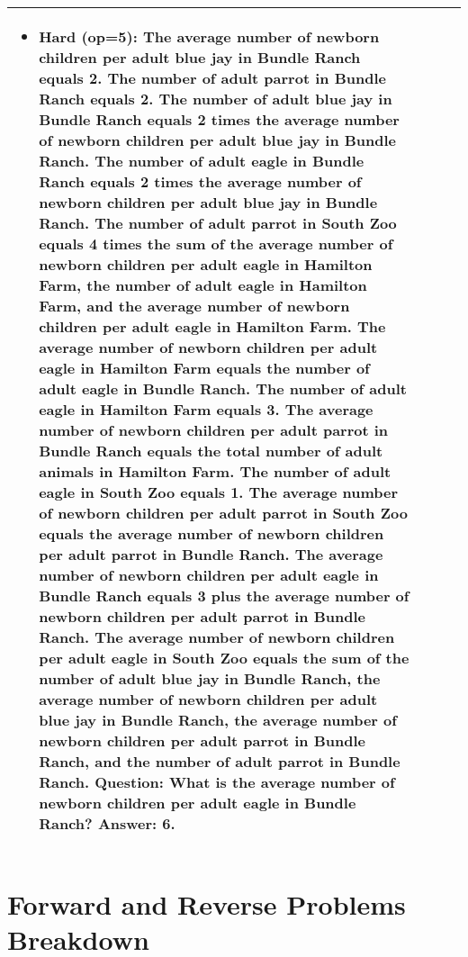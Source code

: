 \begin{table}[h]
\begin{tabular}{llll}
{\begin{itemize}
\item \textbf{Hard (op=5):} The average number of newborn children per adult blue jay in Bundle Ranch equals 2. The number of adult parrot in Bundle Ranch equals 2. The number of adult blue jay in Bundle Ranch equals 2 times the average number of newborn children per adult blue jay in Bundle Ranch. The number of adult eagle in Bundle Ranch equals 2 times the average number of newborn children per adult blue jay in Bundle Ranch. The number of adult parrot in South Zoo equals 4 times the sum of the average number of newborn children per adult eagle in Hamilton Farm, the number of adult eagle in Hamilton Farm, and the average number of newborn children per adult eagle in Hamilton Farm. The average number of newborn children per adult eagle in Hamilton Farm equals the number of adult eagle in Bundle Ranch. The number of adult eagle in Hamilton Farm equals 3. The average number of newborn children per adult parrot in Bundle Ranch equals the total number of adult animals in Hamilton Farm. The number of adult eagle in South Zoo equals 1. The average number of newborn children per adult parrot in South Zoo equals the average number of newborn children per adult parrot in Bundle Ranch. The average number of newborn children per adult eagle in Bundle Ranch equals 3 plus the average number of newborn children per adult parrot in Bundle Ranch. The average number of newborn children per adult eagle in South Zoo equals the sum of the number of adult blue jay in Bundle Ranch, the average number of newborn children per adult blue jay in Bundle Ranch, the average number of newborn children per adult parrot in Bundle Ranch, and the number of adult parrot in Bundle Ranch.  Question: What is the average number of newborn children per adult eagle in Bundle Ranch?
\textbf{Answer}: 6.
\end{itemize}
}\\ 
\bottomrule
\end{tabular}
\end{table}

\newpage
\section{Forward and Reverse Problems Breakdown} 
\label{forwardreverse} 

